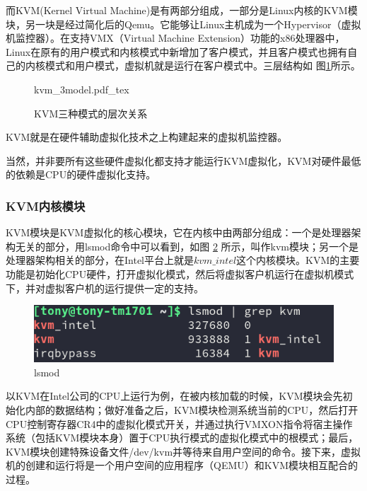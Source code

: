 而KVM(Kernel Virtual Machine)是有两部分组成，一部分是Linux内核的KVM模块，另一块是经过简化后的Qemu。它能够让Linux主机成为一个Hypervisor（虚拟机监控器）。在支持VMX（Virtual    Machine Extension）功能的x86处理器中，Linux在原有的用户模式和内核模式中新增加了客户模式，并且客户模式也拥有自己的内核模式和用户模式，虚拟机就是运行在客户模式中。三层结构如   图\ref{fig:kvm}所示。

\begin{figure}[htbp]
    \centering
    \def\svgscale{0.5}
    {kvm_3model.pdf_tex}
    \caption{KVM三种模式的层次关系}
    \label{fig:kvm}
\end{figure}    

KVM就是在硬件辅助虚拟化技术之上构建起来的虚拟机监控器。

当然，并非要所有这些硬件虚拟化都支持才能运行KVM虚拟化，KVM对硬件最低的依赖是CPU的硬件虚拟化支持。

\subsubsection{KVM内核模块}
KVM模块是KVM虚拟化的核心模块，它在内核中由两部分组成：一个是处理器架构无关的部分，用lsmod命令中可以看到，如图 \ref{fig:lsmod_kvm} 所示，叫作kvm模块；另一个是处理器架构相关的部分，在Intel平台上就是$kvm\_intel$这个内核模块。KVM的主要功能是初始化CPU硬件，打开虚拟化模式，然后将虚拟客户机运行在虚拟机模式下，并对虚拟客户机的运行提供一定的支持。

\begin{figure}[htbp]
  \centering %
  \includegraphics[width=0.9 \textwidth]{figs/RISC-V/KVM/lsmod_kvm.png}
  \caption{lsmod}
  \label{fig:lsmod_kvm} %
\end{figure}

以KVM在Intel公司的CPU上运行为例，在被内核加载的时候，KVM模块会先初始化内部的数据结构；做好准备之后，KVM模块检测系统当前的CPU，然后打开CPU控制寄存器CR4中的虚拟化模式开关，并通过执行VMXON指令将宿主操作系统（包括KVM模块本身）置于CPU执行模式的虚拟化模式中的根模式；最后，KVM模块创建特殊设备文件/dev/kvm并等待来自用户空间的命令。接下来，虚拟机的创建和运行将是一个用户空间的应用程序（QEMU）和KVM模块相互配合的过程。

